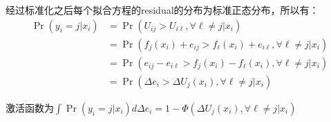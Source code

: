 \documentclass[cn]{elegantpaper}
\begin{document}
经过标准化之后每个拟合方程的residual的分布为标准正态分布，所以有：
\begin{equation}
\begin{aligned} \operatorname{Pr}\left(y_{i}=j | x_{i}\right) &=\operatorname{Pr}\left(U_{i j}>U_{i \ell}, \forall \ell \neq j | x_{i}\right) \\ &=\operatorname{Pr}\left(f_{j}\left(x_{i}\right)+e_{i j}>f_{\ell}\left(x_{i}\right)+e_{i \ell}, \forall \ell \neq j | x_{i}\right) \\ &=\operatorname{Pr}\left(e_{i j}-e_{i \ell}>f_{j}\left(x_{i}\right)-f_{\ell}\left(x_{i}\right),\forall \ell \neq j | x_{i}\right) \\&=\operatorname{Pr}\left(\Delta e_{i}>\Delta U_{j}\left(x_{i}\right),\forall \ell \neq j | x_{i}\right) 
\end{aligned}
\end{equation}

激活函数为\quad\quad $\int \operatorname{Pr}\left(y_{i}=j | x_{i}\right) d \Delta e_{i} = 1-\Phi(\Delta U_{j}\left(x_{i}\right),\forall \ell \neq j | x_{i})$
\end{document}
